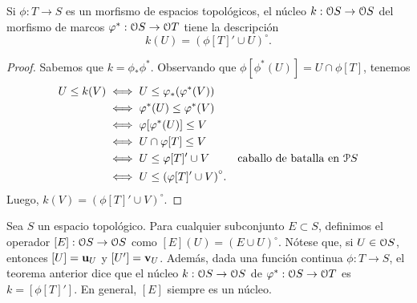 \begin{theorem}
  Si $\phi:T\to S$ es un morfismo de espacios topológicos,
  el núcleo $k:\cal OS\to\cal OS$ del morfismo de marcos
  $\phi^*:\cal OS\to\cal OT$ tiene la descripción
  \[
    k(U) = (\phi[T]' \cup U)^\circ
  .\]
\end{theorem}
\begin{proof}
    Sabemos que $k=\phi_*\phi^*$.
    Observando que $\phi[\phi^*(U)]=U\cap\phi[T]$, tenemos
    \begin{align*}
        U\leq k(V)
        &\iff U \leq \phi_*(\phi^*(V)) \\
        &\iff \phi^*(U)\leq\phi^*(V) \\
        &\iff \phi[\phi^*(U)] \leq V \\
        &\iff U\cap \phi[T] \leq V \\
        &\iff U\leq \phi[T]'\cup V
            &\text{caballo de batalla en $\cal PS$} \\
        &\iff U\leq {(\phi[T]'\cup V)}^\circ.
    \end{align*}
    Luego, $k(V)={(\phi[T]'\cup V)}^\circ$.
\end{proof}

Sea $S$ un espacio topológico. Para cualquier subconjunto
$E\subset S$, definimos el operador $[E]:\cal O S\to \cal O S$
como $[E](U)={(E\cup U)}^{\circ}$.
Nótese que, si $U \in \cal OS$, entonces $[U]=\unuc U$
y $[U']=\vnuc U$.
Además, dada una función continua $\phi:T\to S$,
el teorema anterior dice que el núcleo
$k:\cal OS\to\cal OS$ de $\phi^*:\cal OS\to\cal OT$ es
$k=[\phi[T]']$. En general, $[E]$ siempre es un núcleo.

